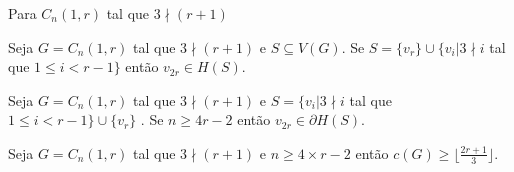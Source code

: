 \begin{frame}{Para $C_n(1,r)$ tal que $3\nmid(r+1)$}
\begin{lema}
        \label{lemma-carat-1-r-geral}
        Seja $G=C_n(1,r)$ tal que $3\nmid(r+1)$ e $S\subseteq V(G)$. Se $S=\{v_r\}\cup \{ v_i | 3 \nmid i $ tal que $1\le i  < r-1 \}$ então $v_{2r} \in H(S)$.
    \end{lema}
    \begin{lema}
        \label{lemma-carat-1-rx3-geral}
        Seja $G = C_n(1,r)$ tal que $3 \nmid (r+1)$ e $S=\{ v_i | 3 \nmid i $ tal que $1\le i  < r-1 \}\cup \{v_r\}$  . Se $n \ge 4r - 2$ então $ v_{2r} \in  \partial H(S)$.
    \end{lema}

    \begin{teo}
        \label{theorem-carat-1-r-geral}
        Seja $G = C_n(1,r)$ tal que $3 \nmid (r+1)$ e $n \ge 4\times r - 2$  então $c(G) \ge \lfloor \frac{2r+1}{3} \rfloor$. %
    \end{teo}
\end{frame}